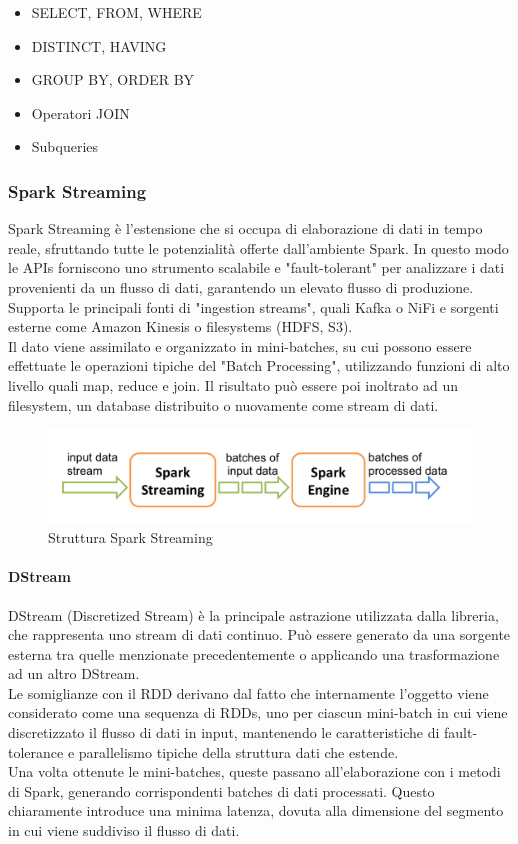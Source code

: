 \begin{itemize}
	\item SELECT, FROM, WHERE
	\item DISTINCT, HAVING
	\item GROUP BY, ORDER BY
	\item Operatori JOIN
	\item Subqueries
\end{itemize}

\subsubsection{Spark Streaming}
Spark Streaming \cite{spark_stream_doc} è l'estensione che si occupa di elaborazione di dati in tempo reale, sfruttando tutte le potenzialità offerte dall'ambiente Spark. In questo modo le APIs forniscono uno strumento scalabile e "fault-tolerant" per analizzare i dati provenienti da un flusso di dati, garantendo un elevato flusso di produzione. Supporta le principali fonti di "ingestion streams", quali Kafka o NiFi e sorgenti esterne come Amazon Kinesis o filesystems (HDFS, S3).\\
Il dato viene assimilato e organizzato in mini-batches, su cui possono essere effettuate le operazioni tipiche del "Batch Processing", utilizzando funzioni di alto livello quali map, reduce e join. Il risultato può essere poi inoltrato ad un filesystem, un database distribuito o nuovamente come stream di dati.

\begin{figure}[h]
	\centering
	\includegraphics[scale=0.75]{Figures/spark_streaming.png}
	\decoRule
	\caption[Struttura Spark Streaming]{Struttura Spark Streaming}
	\label{fig:Struttura Spark Streaming}
\end{figure}

\paragraph{DStream}
DStream (Discretized Stream) è la principale astrazione utilizzata dalla libreria, che rappresenta uno stream di dati continuo. Può essere generato da una sorgente esterna tra quelle menzionate precedentemente o applicando una trasformazione ad un altro DStream.\\
Le somiglianze con il RDD derivano dal fatto che internamente l'oggetto viene considerato come una sequenza di RDDs, uno per ciascun mini-batch in cui viene discretizzato il flusso di dati in input, mantenendo le caratteristiche di fault-tolerance e parallelismo tipiche della struttura dati che estende.\\
Una volta ottenute le mini-batches, queste passano all'elaborazione con i metodi di Spark, generando corrispondenti batches di dati processati. Questo chiaramente introduce una minima latenza, dovuta alla dimensione del segmento in cui viene suddiviso il flusso di dati.

